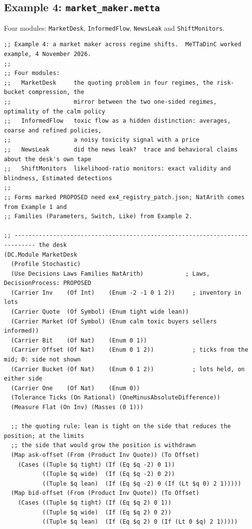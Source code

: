 \documentclass[11pt]{article}
\newcommand{\fpath}[1]{\nolinkurl{#1}}
\newcommand{\code}[1]{\texttt{#1}}
\theoremstyle{definition}
\theoremstyle{plain}
\begin{document}
\subsection{Example 4: \texorpdfstring{\fpath{market_maker.metta}}{market\_maker.metta}}
Four modules: \code{MarketDesk}, \code{InformedFlow}, \code{NewsLeak} and \code{ShiftMonitors}.
\begin{lstlisting}[style=mettafull]
;; Example 4: a market maker across regime shifts.  MeTTaDinC worked example, 4 November 2026.
;;
;; Four modules:
;;   MarketDesk     the quoting problem in four regimes, the risk-bucket compression, the
;;                  mirror between the two one-sided regimes, optimality of the calm policy
;;   InformedFlow   toxic flow as a hidden distinction: averages, coarse and refined policies,
;;                  a noisy toxicity signal with a price
;;   NewsLeak       did the news leak?  trace and behavioral claims about the desk's own tape
;;   ShiftMonitors  likelihood-ratio monitors: exact validity and blindness, Estimated detections
;;
;; Forms marked PROPOSED need ex4_registry_patch.json; NatArith comes from Example 1 and
;; Families (Parameters, Switch, Like) from Example 2.

;; ---------------------------------------------------------------------------- the desk
(DC.Module MarketDesk
  (Profile Stochastic)
  (Use Decisions Laws Families NatArith)            ; Laws, DecisionProcess: PROPOSED
  (Carrier Inv    (Of Int)    (Enum -2 -1 0 1 2))     ; inventory in lots
  (Carrier Quote  (Of Symbol) (Enum tight wide lean))
  (Carrier Market (Of Symbol) (Enum calm toxic buyers sellers informed))
  (Carrier Bit    (Of Nat)    (Enum 0 1))
  (Carrier Offset (Of Nat)    (Enum 0 1 2))           ; ticks from the mid; 0: side not shown
  (Carrier Bucket (Of Nat)    (Enum 0 1 2))           ; lots held, on either side
  (Carrier One    (Of Nat)    (Enum 0))
  (Tolerance Ticks (On Rational) (OneMinusAbsoluteDifference))
  (Measure Flat (On Inv) (Masses (0 1)))

  ;; the quoting rule: lean is tight on the side that reduces the position; at the limits
  ;; the side that would grow the position is withdrawn
  (Map ask-offset (From (Product Inv Quote)) (To Offset)
    (Cases ((Tuple $q tight) (If (Eq $q -2) 0 1))
           ((Tuple $q wide)  (If (Eq $q -2) 0 2))
           ((Tuple $q lean)  (If (Eq $q -2) 0 (If (Lt $q 0) 2 1)))))
  (Map bid-offset (From (Product Inv Quote)) (To Offset)
    (Cases ((Tuple $q tight) (If (Eq $q 2) 0 1))
           ((Tuple $q wide)  (If (Eq $q 2) 0 2))
           ((Tuple $q lean)  (If (Eq $q 2) 0 (If (Lt 0 $q) 2 1)))))


\end{lstlisting}
\end{document}
